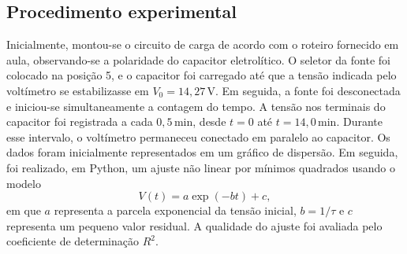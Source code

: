 \documentclass[a4paper,12pt]{article}
\begin{document}
\subsection{Procedimento experimental}
Inicialmente, montou-se o circuito de carga de acordo com o roteiro fornecido em
aula, observando-se a polaridade do capacitor eletrolítico. O seletor da fonte foi
colocado na posição 5, e o capacitor foi carregado até que a tensão indicada pelo
voltímetro se estabilizasse em $V_0=14{,}27\,\mathrm{V}$.
Em seguida, a fonte foi desconectada e iniciou-se simultaneamente a contagem do
tempo. A tensão nos terminais do capacitor foi registrada a cada
$0{,}5\,\mathrm{min}$, desde $t=0$ até $t=14{,}0\,\mathrm{min}$. Durante esse
intervalo, o voltímetro permaneceu conectado em paralelo ao capacitor.
Os dados foram inicialmente representados em um gráfico de dispersão. Em seguida,
foi realizado, em Python, um ajuste não linear por mínimos quadrados usando o
modelo
\begin{equation}
  V(t)=a\exp(-bt)+c,
  \label{eq:modelo_ajuste}
\end{equation}
em que $a$ representa a parcela exponencial da tensão inicial, $b=1/\tau$ e $c$
representa um pequeno valor residual. A qualidade do ajuste foi avaliada pelo
coeficiente de determinação $R^2$.
\end{document}
